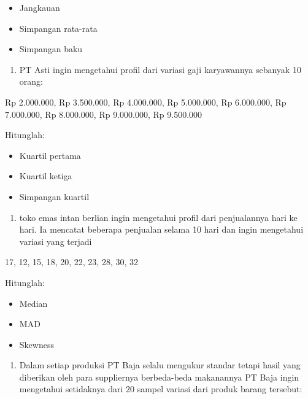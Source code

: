 \documentclass[
]{book}
\providecommand{\tightlist}{%
  \setlength{\itemsep}{0pt}\setlength{\parskip}{0pt}}
\theoremstyle{definition}
\theoremstyle{definition}
\theoremstyle{definition}
\theoremstyle{definition}
\theoremstyle{remark}
\begin{document}
\begin{itemize}
\tightlist
\item
  Jangkauan
\item
  Simpangan rata-rata
\item
  Simpangan baku
\end{itemize}

\begin{enumerate}
\def\labelenumi{\arabic{enumi}.}
\setcounter{enumi}{1}
\tightlist
\item
  PT Asti ingin mengetahui profil dari variasi gaji karyawannya sebanyak 10 orang:
\end{enumerate}

Rp 2.000.000, Rp 3.500.000, Rp 4.000.000, Rp 5.000.000, Rp 6.000.000, Rp 7.000.000, Rp 8.000.000, Rp 9.000.000, Rp 9.500.000

Hitunglah:

\begin{itemize}
\tightlist
\item
  Kuartil pertama
\item
  Kuartil ketiga
\item
  Simpangan kuartil
\end{itemize}

\begin{enumerate}
\def\labelenumi{\arabic{enumi}.}
\setcounter{enumi}{2}
\tightlist
\item
  toko emas intan berlian ingin mengetahui profil dari penjualannya hari ke hari. Ia mencatat beberapa penjualan selama 10 hari dan ingin mengetahui variasi yang terjadi
\end{enumerate}

17, 12, 15, 18, 20, 22, 23, 28, 30, 32

Hitunglah:

\begin{itemize}
\tightlist
\item
  Median
\item
  MAD
\item
  Skewness
\end{itemize}

\begin{enumerate}
\def\labelenumi{\arabic{enumi}.}
\setcounter{enumi}{3}
\tightlist
\item
  Dalam setiap produksi PT Baja selalu mengukur standar tetapi hasil yang diberikan oleh para suppliernya berbeda-beda makanannya PT Baja ingin mengetahui setidaknya dari 20 sampel variasi dari produk barang tersebut:
\end{enumerate}
\end{document}
